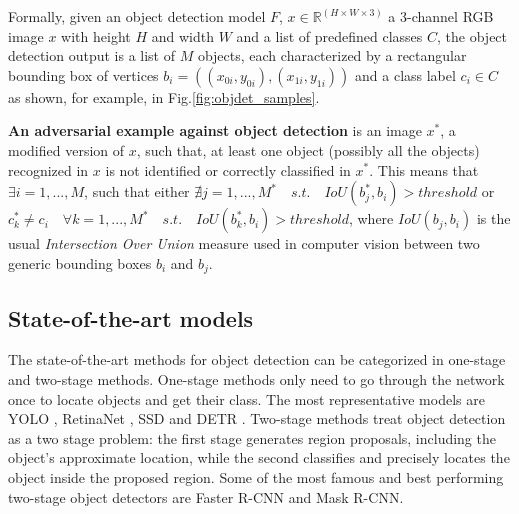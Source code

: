 Formally, given an object detection model $F$, $x \in \mathbb{R}^{(H \times W \times 3)}$ a 3-channel RGB image $x$ with height $H$ and width $W$ and a list of predefined classes $C$, the object detection output is a list of $M$ objects, each characterized by a rectangular bounding box of vertices $b_i=((x_{0i},y_{0i}),(x_{1i},y_{1i}))$ and a class label $c_i\in C$ as shown, for example, in Fig.\ref{fig:objdet_samples}.




\textbf{An adversarial example against object detection}  is an image $x^*$, a modified version of $x$, such that, at least one object (possibly all the objects) recognized in $x$ is not identified or correctly classified in $x^*$. 
This means that $\exists i=1,...,M$, such that either $\nexists j=1,...,M^*\quad  s.t. \quad IoU(b^*_j,b_i) > threshold$ or $ c^*_k\neq c_i \quad \forall k=1,...,M^*\quad  s.t. \quad IoU(b^*_k,b_i) > threshold$, where $IoU(b_j,b_i)$ is the usual \textit{Intersection Over Union} measure used in computer vision between two generic bounding boxes $b_i$ and $b_j$.


\subsection{State-of-the-art models}
The state-of-the-art methods for object detection can be categorized in one-stage and two-stage methods.
One-stage methods only need to go through the network once to locate objects and get their class. The most representative models are YOLO \cite{yolov3,yolov4}, RetinaNet \cite{retinanet}, SSD \cite{ssd} and DETR \cite{detr_paper}.
Two-stage methods treat object detection as a two stage problem: the first stage generates region proposals, including the object's approximate location, while the second classifies and precisely locates the object inside the proposed region. Some of the most famous and best performing two-stage object detectors are Faster R-CNN and Mask R-CNN.



